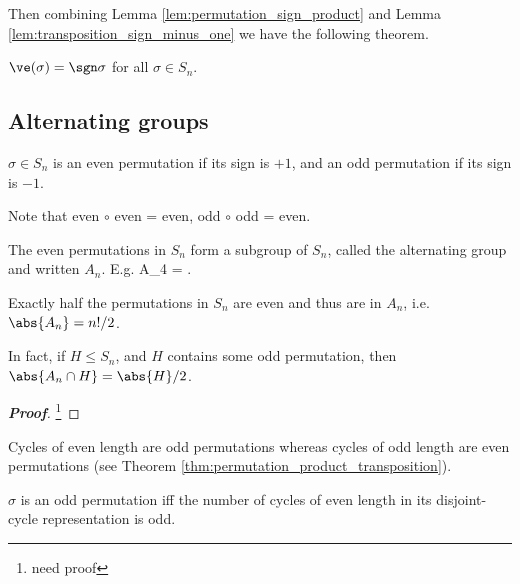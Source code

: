 Then combining Lemma \ref{lem:permutation_sign_product} and Lemma \ref{lem:transposition_sign_minus_one} we have the following theorem.

\begin{theorem}
$\ve(\sigma) = \sgn\sigma$ for all $\sigma \in S_n$.
\end{theorem}



\subsection{Alternating groups}\label{subsec:alternating_groups}%

\begin{definition}
$\sigma \in S_n$ is an even permutation if its sign is $+1$, and an odd permutation if its sign is $-1$. 
\end{definition}

\begin{remark}
Note that even $\circ$ even = even, odd $\circ$ odd = even.%
\end{remark}

\begin{definition}\label{def:alternating_group}
The even permutations in $S_n$ form a subgroup of $S_n$, called the alternating group and written $A_n$. E.g.
\beast
A_4 = .
\eeast
\end{definition}

\begin{theorem}
Exactly half the permutations in $S_n$ are even and thus are in $A_n$, i.e. $\abs{A_n} = n!/2$.

In fact, if $H\leq S_n$, and $H$ contains some odd permutation, then $\abs{A_n\cap H} = \abs{H}/2$.
\end{theorem}

\begin{proof}[\bf Proof]
\footnote{need proof}
\end{proof}

\begin{remark}
Cycles of even length are odd permutations whereas cycles of odd length are even permutations (see Theorem \ref{thm:permutation_product_transposition}).
\end{remark}

\begin{corollary}
$\sigma$ is an odd permutation iff the number of cycles of even length in its disjoint-cycle representation is odd.
\end{corollary}


